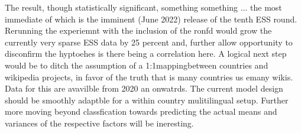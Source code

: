The result, though statistically significant, something something ... the most immediate of which is the imminent (June 2022) release of the tenth ESS round. Rerunning the experiemnt with the inclusion of the ronfd would grow the currently very sparse ESS data by 25 percent and, further allow opportunity to disconfirm the hyptoehes is there being a correlation here.
A logical next step would be to ditch the assumption of a 1:1mappingbetween countries and wikipedia projects, in favor of the truth that is many countries us emany wikis. Data for this are avavilble from 2020 an onwatrds.
The current model design should be smoothly adaptble for a within country mulitilingual setup.
Further more moving beyond classfication towards predicting the actual means and variances of the respective factors will be ineresting.


